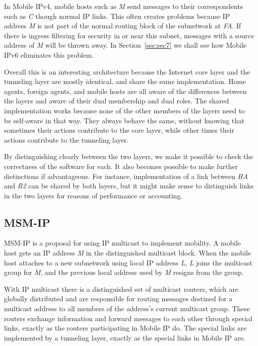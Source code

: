 In Mobile IPv4, mobile hosts such as {\it M} send messages to their
correspondents such as {\it C} though normal IP links.
This often creates problems because IP address {\it M} is not part of
the normal routing block of the subnetwork at {\it FA}.
If there is ingress filtering for security in or near this subnet,
messages with a source address of {\it M} will be thrown away.
In Section~\ref{sec:sec7} we shall see how Mobile IPv6 eliminates this
problem.

Overall this is an interesting architecture because 
the Internet core layer and the tunneling layer
are mostly identical, and share the same
implementation.
Home agents, foreign agents, and mobile hosts are all aware of the
differences between the layers and aware of their dual membership and
dual roles.
The shared implementation works because none of the other members
of the layers need to be self-aware in that way.
They always behave the same, without knowing that sometimes their
actions contribute to the core layer, while other times their actions
contribute to the tunneling layer.

By distinguishing clearly between the two layers,
we make it possible to check the correctness of the software for each.
It also becomes possible to make further distinctions if advantageous.
For instance, implementation of a
link between {\it HA} and {\it R2} can be shared by
both layers, but it might make sense to distinguish links in the two
layers for reasons of performance or accounting.

\subsection{MSM-IP}

MSM-IP \cite{multicast} is a proposal for using IP multicast
to implement mobility.
A mobile host gets an IP address {\it M}
in the distinguished multicast block.
When the mobile host
attaches to a new subnetwork using local IP address {\it L},
{\it L} joins the multicast group for {\it M}, and the previous
local address used by {\it M} resigns from the group.

With IP multicast there is a distinguished set of multicast routers,
which are globally distributed and 
are responsible for routing messages destined for a multicast
address to all members of the address's current multicast group.
These routers exchange information and forward messages to each other
through special links,
exactly as the routers participating
in Mobile IP do.
The special links are implemented by a tunneling layer, exactly as the
special links in Mobile IP are.

